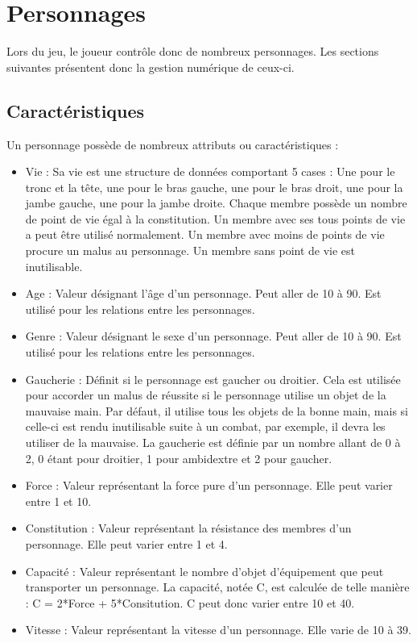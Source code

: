 \section{Personnages}
Lors du jeu, le joueur contrôle donc de nombreux personnages. Les sections suivantes présentent donc la gestion numérique de ceux-ci.
\subsection{Caractéristiques}
Un personnage possède de nombreux attributs ou caractéristiques :
\begin{itemize}
  \item Vie : Sa vie est une structure de données comportant 5 cases : Une pour le tronc et la tête, une pour le bras gauche, une pour le bras droit, une pour la jambe gauche, une pour la jambe droite. Chaque membre possède un nombre de point de vie égal à la constitution. Un membre avec ses tous points de vie a peut être utilisé normalement. Un membre avec moins de points de vie procure un malus au personnage. Un membre sans point de vie est inutilisable.
  \item Age : Valeur désignant l'âge d'un personnage. Peut aller de 10 à 90. Est utilisé pour les relations entre les personnages.
  \item Genre : Valeur désignant le sexe d'un personnage. Peut aller de 10 à 90. Est utilisé pour les relations entre les personnages.
  \item Gaucherie : Définit si le personnage est gaucher ou droitier. Cela est utilisée pour accorder un malus de réussite si le personnage utilise un objet de la mauvaise main. Par défaut, il utilise tous les objets de la bonne main, mais si celle-ci est rendu inutilisable suite à un combat, par exemple, il devra les utiliser de la mauvaise. La gaucherie est définie par un nombre allant de 0 à 2, 0 étant pour droitier, 1 pour ambidextre et 2 pour gaucher.
  \item Force : Valeur représentant la force pure d'un personnage. Elle peut varier entre 1 et 10.
  \item Constitution : Valeur représentant la résistance des membres d'un personnage. Elle peut varier entre 1 et 4.
  \item Capacité : Valeur représentant le nombre d'objet d'équipement que peut transporter un personnage. La capacité, notée C, est calculée de telle manière : C = 2*Force +  5*Consitution. C peut donc varier entre 10 et 40.
  \item Vitesse : Valeur représentant la vitesse d'un personnage. Elle varie de 10 à 39.

\end{itemize}
